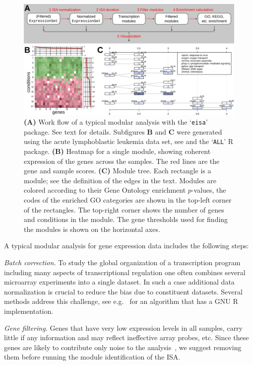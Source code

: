 \documentclass{bioinfo}
\newcommand{\Rpackage}[1]{`\texttt{#1}'}
\newcommand{\subfig}[1]{\textbf{#1}}
\begin{document}
\begin{figure}
\centering
\includegraphics[width=\textwidth]{isa2workflow3}
\caption{\subfig{(A)} Work flow of a typical modular analysis with the
  \Rpackage{eisa} package. See text for details.
  Subfigures \subfig{B} and \subfig{C} were generated
  using the acute lymphoblastic leukemia data set, see
  \citep{chiaretti04} and the \Rpackage{ALL} R package.
  \subfig{(B)} Heatmap for a single module, showing coherent
  expression of the genes across the samples. The red lines are the gene and
  sample scores.
  \subfig{(C)} Module tree. Each rectangle is a module; see the
  definition of the edges in the text. Modules are colored
  according to their Gene Ontology enrichment $p$-values, the codes of
  the enriched GO categories are shown in the top-left corner of the
  rectangles. The top-right corner shows the number of genes and
  conditions in the module. The gene thresholds used for finding
  the modules is shown on the horizontal axes.
}
\label{fig:workflow}
\end{figure}

A typical modular analysis for gene expression data includes the following
steps:

\emph{Batch correction.}
To study the global organization of a transcription program including
many aspects of transcriptional regulation one often combines several
microarray experiments into a single dataset. In such a case
additional data normalization is crucial to reduce the bias due to
constituent datasets. Several methods address this challenge,
see e.g.~\citep{johnson07} for an algorithm that has a GNU R
implementation.

\emph{Gene filtering.}
Genes that have very low expression levels in all samples, carry little if
any information and may reflect ineffective array probes, etc. Since these
genes are likely to contribute only noise to the
analysis~\citep{hackstadt09}, we suggest removing them before running
the module identification of the ISA.
\end{document}
